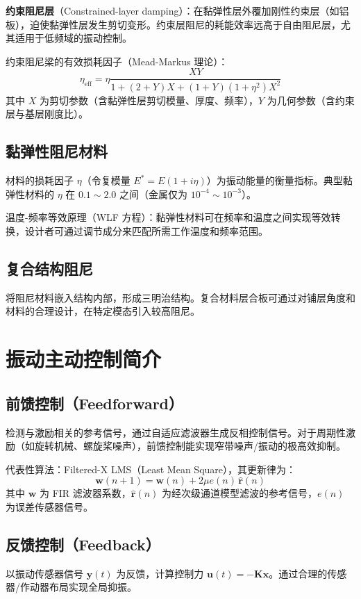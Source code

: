\textbf{约束阻尼层}（Constrained-layer damping）：在黏弹性层外覆加刚性约束层（如铝板），迫使黏弹性层发生剪切变形。约束层阻尼的耗能效率远高于自由阻尼层，尤其适用于低频域的振动控制。

\begin{myformula}
约束阻尼梁的有效损耗因子（Mead-Markus 理论）：
\[
\eta_{\text{eff}} = \eta\frac{XY}{1 + (2 + Y)X + (1 + Y)(1 + \eta^{2})X^{2}}
\]
其中 $X$ 为剪切参数（含黏弹性层剪切模量、厚度、频率），$Y$ 为几何参数（含约束层与基层刚度比）。
\end{myformula}

\subsection{黏弹性阻尼材料}
材料的损耗因子 $\eta$（令复模量 $E^{*} = E(1 + i\eta)$）为振动能量的衡量指标。典型黏弹性材料的 $\eta$ 在 $0.1 \sim 2.0$ 之间（金属仅为 $10^{-4} \sim 10^{-3}$）。

温度-频率等效原理（WLF 方程）：黏弹性材料可在频率和温度之间实现等效转换，设计者可通过调节成分来匹配所需工作温度和频率范围。

\subsection{复合结构阻尼}
将阻尼材料嵌入结构内部，形成三明治结构。复合材料层合板可通过对铺层角度和材料的合理设计，在特定模态引入较高阻尼。

\section{振动主动控制简介}
\subsection{前馈控制（Feedforward）}
检测与激励相关的参考信号，通过自适应滤波器生成反相控制信号。对于周期性激励（如旋转机械、螺旋桨噪声），前馈控制能实现窄带噪声/振动的极高效抑制。

代表性算法：Filtered-X LMS（Least Mean Square），其更新律为：
\[
\mathbf{w}(n+1) = \mathbf{w}(n) + 2\mu e(n)\,\hat{\mathbf{r}}(n)
\]
其中 $\mathbf{w}$ 为 FIR 滤波器系数，$\hat{\mathbf{r}}(n)$ 为经次级通道模型滤波的参考信号，$e(n)$ 为误差传感器信号。

\subsection{反馈控制（Feedback）}
以振动传感器信号 $\mathbf{y}(t)$ 为反馈，计算控制力 $\mathbf{u}(t) = -\mathbf{K}\mathbf{x}$。通过合理的传感器/作动器布局实现全局抑振。

